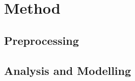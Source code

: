 \documentclass[11pt]{article}
\begin{document}
\section{Method}

\subsection{Preprocessing}

\subsection{Analysis and Modelling}




\end{document}
